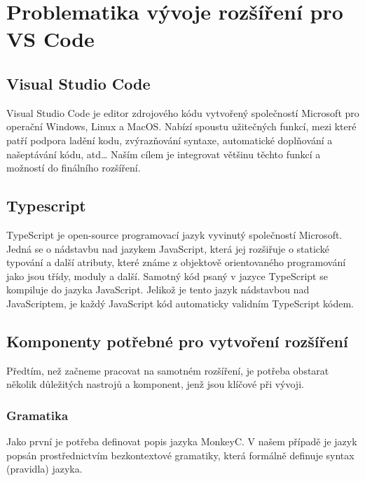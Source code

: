 \chapter{Problematika vývoje rozšíření pro VS Code}

\section{Visual Studio Code}
Visual Studio Code \cite{VSCODE_2020} je editor zdrojového kódu vytvořený společností Microsoft pro operační Windows, Linux a MacOS. Nabízí spoustu užitečných funkcí, mezi které patří podpora ladění kodu, zvýrazňování syntaxe, automatické doplňování a našeptávání kódu, atd… Naším cílem je integrovat většinu těchto funkcí a možností do finálního rozšíření.

\section{Typescript}
TypeScript \cite{TypeScript_wikipedia_2020} je open-source programovací jazyk vyvinutý společností Microsoft. Jedná se o nádstavbu nad jazykem JavaScript,
která jej rozšiřuje o statické typování a další atributy, které známe z objektově orientovaného programování jako jsou třídy, moduly a další. Samotný kód psaný v jazyce TypeScript se kompiluje
do jazyka JavaScript. Jelikož je tento jazyk nádstavbou nad JavaScriptem, je každý JavaScript kód automaticky validním TypeScript kódem.

\section{Komponenty potřebné pro vytvoření rozšíření}
Předtím, než začneme pracovat na samotném rozšíření, je potřeba obstarat několik důležitých nastrojů a komponent, jenž jsou klíčové při vývoji.
\subsection{Gramatika}
Jako první je potřeba definovat popis jazyka MonkeyC. V našem případě je jazyk popsán prostřednictvím bezkontextové gramatiky, která formálně definuje syntax (pravidla) jazyka.

